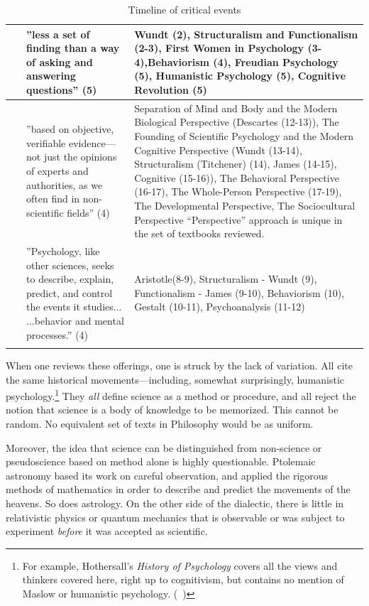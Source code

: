 \begin{refsection}
\begin{longtable}[!t]{ | P{2cm} | P{5cm} | P{7cm} | }
~\citep{Myers:2015ws}&”less a set of finding than a way of asking and answering questions” (5)&Wundt (2), Structuralism and Functionalism (2-3), First Women in Psychology (3-4),Behaviorism (4), Freudian Psychology (5), Humanistic Psychology (5), Cognitive Revolution (5) \\ \hline
~\citep{Zimbardo:2012uz}&”based on objective, verifiable evidence---not just the opinions of experts and authorities, as we often find in non-scientific fields” (4) &Separation of Mind and Body and the Modern Biological Perspective (Descartes (12-13)), The Founding of Scientific Psychology and the Modern Cognitive Perspective (Wundt (13-14), Structuralism (Titchener) (14), James (14-15), Cognitive (15-16)), The Behavioral Perspective (16-17), The Whole-Person Perspective (17-19), The Developmental Perspective, The Sociocultural Perspective \newline “Perspective” approach is unique in the set of textbooks reviewed.\\ \hline
~\citep{Rathus:2012uz}&”Psychology, like other sciences, seeks to describe, explain, predict, and control the events it studies... ...behavior and mental processes.” (4)& Aristotle(8-9), Structuralism - Wundt (9), Functionalism - James (9-10), Behaviorism (10), Gestalt (10-11), Psychoanalysis (11-12) \\ \hline
\caption{Timeline of critical events}
\label{table: timeline}
\end{longtable}

When one reviews these offerings, one is struck by the lack of variation. All cite the same historical movements---including, somewhat surprisingly, humanistic psychology.\footnote{For example, Hothersall’s \emph{History of Psychology} covers all the views and thinkers covered here, right up to cognitivism, but contains no mention of Maslow or humanistic psychology. (~\citep{Hothersall:1984te})} They \emph{all} define science as a method or procedure, and all reject the notion that science is a body of knowledge to be memorized. This cannot be random. No equivalent set of texts in Philosophy would be as uniform.

Moreover, the idea that science can be distinguished from non-science or pseudoscience based on method alone is highly questionable. Ptolemaic astronomy based its work on careful observation, and applied the rigorous methods of mathematics in order to describe and predict the movements of the heavens. So does astrology. On the other side of the dialectic, there is little in relativistic physics or quantum mechanics that is observable or was subject to experiment \emph{before} it was accepted as scientific. 


\end{refsection}
